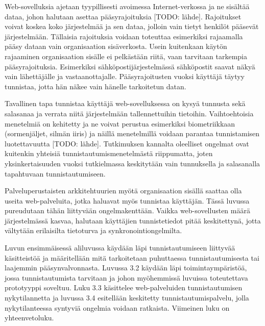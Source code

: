 Web-sovelluksia ajetaan tyypillisesti avoimessa Internet-verkossa ja ne sisältää dataa, johon halutaan asettaa pääsyrajoituksia [TODO: lähde]. Rajoitukset voivat koskea koko järjestelmää ja sen dataa, jolloin vain tietyt henkilöt pääsevät järjestelmään. Tällaisia rajoituksia voidaan toteuttaa esimerkiksi rajaamalla pääsy dataan vain organisaation sisäverkosta. Usein kuitenkaan käytön rajaaminen organisaation sisälle ei pelkästään riitä, vaan tarvitaan tarkempia pääsyrajoituksia. Esimerkiksi sähköpostijärjestelmässä sähköpostit saavat näkyä vain lähettäjälle ja vastaanottajalle. Pääsyrajoitusten vuoksi käyttäjä täytyy tunnistaa, jotta hän näkee vain hänelle tarkoitetun datan.

Tavallinen tapa tunnistaa käyttäjä web-sovelluksessa on kysyä tunnusta sekä salasanaa ja verrata niitä järjestelmään tallennettuihin tietoihin. Vaihtoehtoisia menetelmiä on kehitetty ja ne voivat perustua esimerkiksi biometriikkaan (sormenjäljet, silmän iiris) ja näillä menetelmillä voidaan parantaa tunnistamisen luotettavuutta [TODO: lähde]. Tutkimuksen kannalta oleelliset ongelmat ovat kuitenkin yhteisiä tunnistautumismenetelmästä riippumatta, joten yksinkertaisuuden vuoksi tutkielmassa keskitytään vain tunnuksella ja salasanalla tapahtuvaan tunnistautumiseen.

Palveluperustaisten arkkitehtuurien myötä organisaation sisällä saattaa olla useita web-palveluita, jotka haluavat myös tunnistaa käyttäjän. Tässä luvussa pureudutaan tähän liittyvään ongelmakenttään. Vaikka web-sovellusten määrä järjestelmässä kasvaa, halutaan käyttäjien tunnistetiedot pitää keskitettynä, jotta vältytään erilaisilta tietoturva ja synkronointiongelmilta.

Luvun ensimmäisessä aliluvussa käydään läpi tunnistautumiseen liittyvää käsitteistöä ja määritellään mitä tarkoitetaan puhuttaessa tunnistautumisesta tai laajemmin pääsynvalvonnasta. Luvussa 3.2 käydään läpi toimintaympäristöä, jossa tunnistautumista tarvitaan ja johon myöhemmissä luvuissa toteutettava prototyyppi soveltuu. Luku 3.3 käsittelee web-palveluiden tunnistautumisen nykytilannetta ja luvussa 3.4 esitellään keskitetty tunnistautumispalvelu, jolla nykytilanteessa syntyviä ongelmia voidaan ratkaista. Viimeinen luku on yhteenvetoluku.